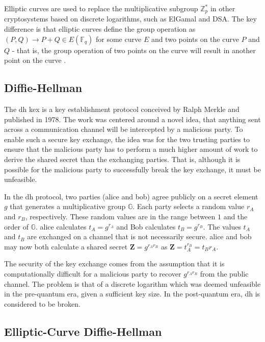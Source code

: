Elliptic curves are used to replace the multiplicative subgroup $\mathbb{Z}_p^*$ in other cryptosystems based on discrete logarithms, such as ElGamal and DSA\cite{delfs2007}. The key difference is that elliptic curves define the group operation as $(P, Q)\to P+Q\in E(\mathbb{F}_q)$ for some curve $E$ and two points on the curve $P$ and $Q$ - that is, the group operation of two points on the curve will result in another point on the curve \cite{delfs2007}.

\subsection{Diffie-Hellman}
\label{section:background:diffie-hellman}

The \gls{dh} \gls{kex} is a key establishment protocol conceived by Ralph Merkle and published in 1978\cite{merkle1978}. The work was centered around a novel idea, that anything sent across a communication channel will be intercepted by a malicious party. To enable such a secure key exchange, the idea was for the two trusting parties to ensure that the malicious party has to perform a much higher amount of work to derive the shared secret than the exchanging parties. That is, although it is possible for the malicious party to successfully break the key exchange, it must be unfeasible\cite{merkle1978}.

In the \gls{dh} protocol, two parties (\gls{alice} and \gls{bob}) agree publicly on a secret element $g$ that generates a multiplicative group $\mathbb{G}$. Each party selects a random value $r_A$ and $r_B$, respectively. These random values are in the range between $1$ and the order of $\mathbb{G}$. \gls{alice} calculates $t_A=g^{r_A}$ and Bob calculates $t_B=g^{r_B}$. The values $t_A$ and $t_B$ are exchanged on a channel that is not necessarily secure. \gls{alice} and \gls{bob} may now both calculate a shared secret $\mathbf{Z}=g^{r_A r_B}$ as $\mathbf{Z}=t_A^{r_B}=t_B{r_A}$\cite{merkle1978, boyd2020}.

The security of the key exchange comes from the assumption that it is computationally difficult for a malicious party to recover $g^{r_A r_B}$ from the public channel. The problem is that of a discrete logarithm which was deemed unfeasible in the pre-quantum era, given a sufficient key size\cite{boyd2020}. In the post-quantum era, \gls{dh} is considered to be broken\cite{bernstein2017}.

\subsection{Elliptic-Curve Diffie-Hellman}

